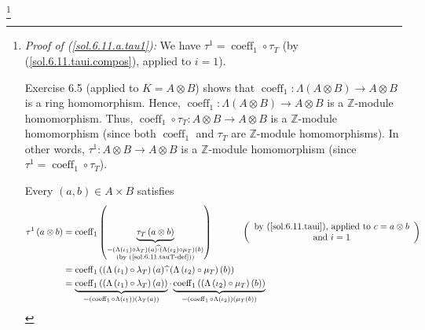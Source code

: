\documentclass[numbers=enddot,12pt,final,onecolumn,notitlepage]{scrartcl}%
\begin{document}
\footnote{\textit{Proof of (\ref{sol.6.11.a.tau1}):} We have $\tau
^{1}=\operatorname*{coeff}\nolimits_{1}\circ\tau_{T}$ (by
(\ref{sol.6.11.taui.compos}), applied to $i=1$).
\par
Exercise 6.5 (applied to $K=A\otimes B$) shows that $\operatorname*{coeff}%
\nolimits_{1}:\Lambda\left(  A\otimes B\right)  \rightarrow A\otimes B$ is a
ring homomorphism. Hence, $\operatorname*{coeff}\nolimits_{1}:\Lambda\left(
A\otimes B\right)  \rightarrow A\otimes B$ is a $\mathbb{Z}$-module
homomorphism. Thus, $\operatorname*{coeff}\nolimits_{1}\circ\tau_{T}:A\otimes
B\rightarrow A\otimes B$ is a $\mathbb{Z}$-module homomorphism (since both
$\operatorname*{coeff}\nolimits_{1}$ and $\tau_{T}$ are $\mathbb{Z}$-module
homomorphisms). In other words, $\tau^{1}:A\otimes B\rightarrow A\otimes B$ is
a $\mathbb{Z}$-module homomorphism (since $\tau^{1}=\operatorname*{coeff}%
\nolimits_{1}\circ\tau_{T}$).
\par
Every $\left(  a,b\right)  \in A\times B$ satisfies%
\begin{align*}
\tau^{1}\left(  a\otimes b\right)   &  =\operatorname*{coeff}\nolimits_{1}%
\left(  \underbrace{\tau_{T}\left(  a\otimes b\right)  }_{\substack{=\left(
\Lambda\left(  \iota_{1}\right)  \circ\lambda_{T}\right)  \left(  a\right)
\widehat{\cdot}\left(  \Lambda\left(  \iota_{2}\right)  \circ\mu_{T}\right)
\left(  b\right)  \\\text{(by (\ref{sol.6.11.tauT-def}))}}}\right)
\ \ \ \ \ \ \ \ \ \ \left(
\begin{array}
[c]{c}%
\text{by (\ref{sol.6.11.taui}), applied to }c=a\otimes b\\
\text{and }i=1
\end{array}
\right) \\
&  =\operatorname*{coeff}\nolimits_{1}\left(  \left(  \Lambda\left(  \iota
_{1}\right)  \circ\lambda_{T}\right)  \left(  a\right)  \widehat{\cdot}\left(
\Lambda\left(  \iota_{2}\right)  \circ\mu_{T}\right)  \left(  b\right)
\right) \\
&  =\underbrace{\operatorname*{coeff}\nolimits_{1}\left(  \left(
\Lambda\left(  \iota_{1}\right)  \circ\lambda_{T}\right)  \left(  a\right)
\right)  }_{=\left(  \operatorname*{coeff}\nolimits_{1}\circ\Lambda\left(
\iota_{1}\right)  \right)  \left(  \lambda_{T}\left(  a\right)  \right)
}\cdot\underbrace{\operatorname*{coeff}\nolimits_{1}\left(  \left(
\Lambda\left(  \iota_{2}\right)  \circ\mu_{T}\right)  \left(  b\right)
\right)  }_{=\left(  \operatorname*{coeff}\nolimits_{1}\circ\Lambda\left(
\iota_{2}\right)  \right)  \left(  \mu_{T}\left(  b\right)  \right)  }\\

\end{align*}}
\end{document}
